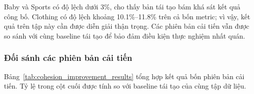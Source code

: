Baby và Sports có độ lệch dưới 3\%, cho thấy bản tái tạo bám khá sát kết quả công bố. Clothing có độ lệch khoảng 10.1\%--11.8\% trên cả bốn metric; vì vậy, kết quả trên tập này cần được diễn giải thận trọng. Các phiên bản cải tiến vẫn được so sánh với cùng baseline tái tạo để bảo đảm điều kiện thực nghiệm nhất quán.


\subsubsection{Đối sánh các phiên bản cải tiến}

Bảng~\ref{tab:cohesion_improvement_results} tổng hợp kết quả bốn phiên bản cải tiến. Tỷ lệ trong cột cuối được tính so với baseline tái tạo của cùng tập dữ liệu.

\begingroup
\fontsize{8.5}{10}\selectfont
\setlength{\tabcolsep}{3pt}
\renewcommand{\arraystretch}{1.15}
